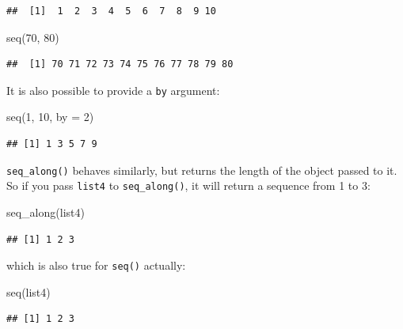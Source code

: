 \documentclass[
]{article}
\newenvironment{Shaded}{\begin{snugshade}}{\end{snugshade}}
\newcommand{\AttributeTok}[1]{\textcolor[rgb]{0.77,0.63,0.00}{#1}}
\newcommand{\DecValTok}[1]{\textcolor[rgb]{0.00,0.00,0.81}{#1}}
\newcommand{\FunctionTok}[1]{\textcolor[rgb]{0.00,0.00,0.00}{#1}}
\newcommand{\NormalTok}[1]{#1}
\begin{document}
\begin{verbatim}
##  [1]  1  2  3  4  5  6  7  8  9 10
\end{verbatim}

\begin{Shaded}
\begin{Highlighting}[]
\FunctionTok{seq}\NormalTok{(}\DecValTok{70}\NormalTok{, }\DecValTok{80}\NormalTok{)}
\end{Highlighting}
\end{Shaded}

\begin{verbatim}
##  [1] 70 71 72 73 74 75 76 77 78 79 80
\end{verbatim}

It is also possible to provide a \texttt{by} argument:

\begin{Shaded}
\begin{Highlighting}[]
\FunctionTok{seq}\NormalTok{(}\DecValTok{1}\NormalTok{, }\DecValTok{10}\NormalTok{, }\AttributeTok{by =} \DecValTok{2}\NormalTok{)}
\end{Highlighting}
\end{Shaded}

\begin{verbatim}
## [1] 1 3 5 7 9
\end{verbatim}

\texttt{seq\_along()} behaves similarly, but returns the length of the object passed to it. So if you pass \texttt{list4} to
\texttt{seq\_along()}, it will return a sequence from 1 to 3:

\begin{Shaded}
\begin{Highlighting}[]
\FunctionTok{seq\_along}\NormalTok{(list4)}
\end{Highlighting}
\end{Shaded}

\begin{verbatim}
## [1] 1 2 3
\end{verbatim}

which is also true for \texttt{seq()} actually:

\begin{Shaded}
\begin{Highlighting}[]
\FunctionTok{seq}\NormalTok{(list4)}
\end{Highlighting}
\end{Shaded}

\begin{verbatim}
## [1] 1 2 3
\end{verbatim}
\end{document}
